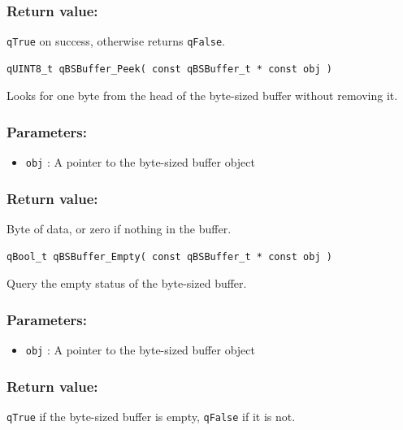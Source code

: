 \documentclass{article}
\begin{document}
\subsubsection*{Return value:}
\lstinline{qTrue} on success, otherwise returns \lstinline{qFalse}.


\noindent\hrulefill

\begin{lstlisting}[style=CStyle]
qUINT8_t qBSBuffer_Peek( const qBSBuffer_t * const obj )
\end{lstlisting}

Looks for one byte from the head of the byte-sized buffer without removing it. 

\subsubsection*{Parameters:}
\begin{itemize}
    \item \lstinline{obj} : A pointer to the byte-sized buffer object
\end{itemize}

\subsubsection*{Return value:}
Byte of data, or zero if nothing in the buffer.

\noindent\hrulefill

\begin{lstlisting}[style=CStyle]
qBool_t qBSBuffer_Empty( const qBSBuffer_t * const obj )
\end{lstlisting}

Query the empty status of the byte-sized buffer. 

\subsubsection*{Parameters:}
\begin{itemize}
    \item \lstinline{obj} : A pointer to the byte-sized buffer object
\end{itemize}

\subsubsection*{Return value:}
\lstinline{qTrue} if the byte-sized buffer is empty, \lstinline{qFalse} if it is not.
\end{document}

